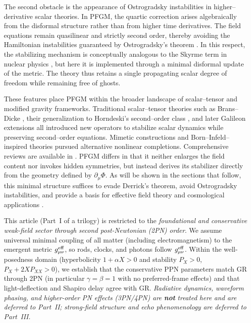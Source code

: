 \documentclass{article}
\begin{document}
The second obstacle is the appearance of Ostrogradsky instabilities in higher–derivative scalar theories. In PFGM, the quartic correction arises algebraically from the disformal structure rather than from higher time derivatives. The field equations remain quasilinear and strictly second order, thereby avoiding the Hamiltonian instabilities guaranteed by Ostrogradsky’s theorem \cite{Woodard2015}. In this respect, the stabilizing mechanism is conceptually analogous to the Skyrme term in nuclear physics \cite{Skyrme1961,Adkins1983}, but here it is implemented through a minimal disformal update of the metric. The theory thus retains a single propagating scalar degree of freedom while remaining free of ghosts.  

These features place PFGM within the broader landscape of scalar–tensor and modified gravity frameworks. Traditional scalar–tensor theories such as Brans–Dicke \cite{Brans1961}, their generalization to Horndeski’s second–order class \cite{Horndeski1974}, and later Galileon extensions \cite{Nicolis2009_Galileon,Deffayet2011_Galileon} all introduced new operators to stabilize scalar dynamics while preserving second–order equations. Mimetic constructions \cite{Chamseddine2013_Mimetic} and Born–Infeld–inspired theories \cite{Banados2010_EiBI} pursued alternative nonlinear completions. Comprehensive reviews are available in \cite{Clifton2012,Joyce2015,deRham2014_Review}. PFGM differs in that it neither enlarges the field content nor invokes hidden symmetries, but instead derives its stabilizer directly from the geometry defined by $\partial_\mu\Phi$. As will be shown in the sections that follow, this minimal structure suffices to evade Derrick’s theorem, avoid Ostrogradsky instabilities, and provide a basis for effective field theory and cosmological applications \cite{Mukhanov2005}.

This article (Part~I of a trilogy) is restricted to the \emph{foundational and conservative weak-field sector through second post-Newtonian (2PN) order}. We assume universal minimal coupling of all matter (including electromagnetism) to the emergent metric \(g^{\rm eff}_{\mu\nu}\), so rods, clocks, and photons follow \(g^{\rm eff}_{\mu\nu}\). Within the well-posedness domain (hyperbolicity \(1+\alpha X>0\) and stability \(P_X>0\), \(P_X{+}2X P_{XX}>0\)), we establish that the conservative PPN parameters match GR through 2PN (in particular \(\gamma=\beta=1\) with no preferred-frame effects) and that light-deflection and Shapiro delay agree with GR. \emph{Radiative dynamics, waveform phasing, and higher-order PN effects (3PN/4PN) are \textbf{not} treated here and are deferred to Part~II; strong-field structure and echo phenomenology are deferred to Part~III.}
\end{document}
